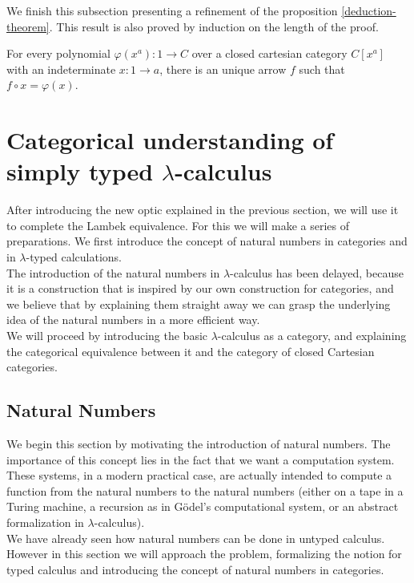 We finish this subsection presenting a refinement of the proposition \ref{deduction-theorem}. This result is also proved by induction on the length of the proof.

\begin{proposition}
  For every polynomial $\varphi(x^a): 1\to C$ over a closed cartesian category $C[x^a]$ with an indeterminate $x:1\to a$, there is an unique arrow $f$ such that $f\circ x=\varphi(x)$.
\end{proposition}

\section{Categorical understanding of simply typed $\lambda$-calculus}
After introducing the new optic explained in the previous section, we will use it to complete the Lambek equivalence. For this we will make a series of preparations. We first introduce the concept of natural numbers in categories and in $\lambda$-typed calculations.\\

The introduction of the natural numbers in $\lambda$-calculus has been delayed, because it is a construction that is inspired by our own construction for categories, and we believe that by explaining them straight away we can grasp the underlying idea of the natural numbers in a more efficient way.\\

We will proceed by introducing the basic $\lambda$-calculus as a category, and explaining the categorical equivalence between it and the category of closed Cartesian categories.

\subsection{Natural Numbers}


We begin this section by motivating the introduction of natural numbers. The importance of this concept lies in the fact that we want a computation system. These systems, in a modern practical case, are actually intended to compute a function from the natural numbers to the natural numbers (either on a tape in a Turing machine, a recursion as in Gödel's computational system, or an abstract formalization in $\lambda$-calculus).\\

We have already seen how natural numbers can be done in untyped calculus. However in this section we will approach the problem, formalizing the notion for typed calculus and introducing the concept of natural numbers in categories.

